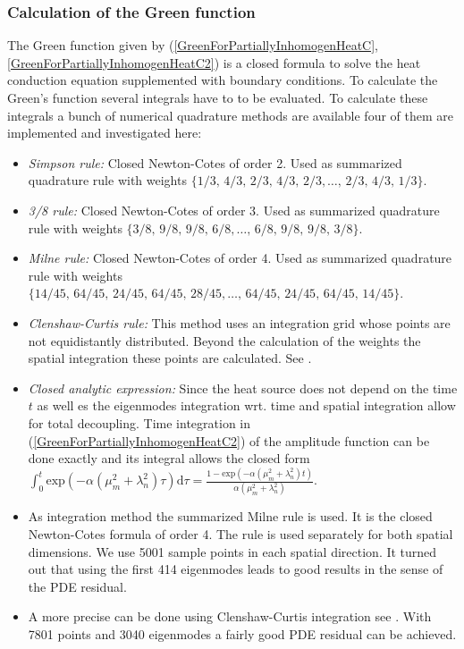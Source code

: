 \documentclass[a4paper,11pt]{article}
\theoremstyle{plain} %
\theoremstyle{definition} %
\theoremstyle{remark} %
\theoremstyle{remark}
\begin{document}
\subsubsection*{Calculation of the Green function}
%
The Green function given by (\ref{GreenForPartiallyInhomogenHeatC},\ref{GreenForPartiallyInhomogenHeatC2}) is a closed formula to solve the heat conduction equation supplemented with boundary conditions. To calculate the Green's function several integrals have to to be evaluated. To calculate these integrals a bunch of numerical quadrature methods are available four of them are implemented and investigated here:
\begin{itemize}
\item \emph{Simpson rule:} Closed Newton-Cotes of order 2. Used as summarized quadrature rule with weights $ \{ 1/3,\, 4/3,\, 2/3,\, 4/3,\, 2/3, \dots ,\, 2/3,\, 4/3,\,  1/3\} $.
\item \emph{3/8 rule:} Closed Newton-Cotes of order 3. Used as summarized quadrature rule with weights $ \{ 3/8,\, 9/8,\,9/8,\,6/8, \dots ,\,6/8,\, 9/8,\,9/8,\, 3/8\} $.
\item \emph{Milne rule:} Closed Newton-Cotes of order 4. Used as summarized quadrature rule with weights $ \{ 14/45,\, 64/45,\,24/45,\, 64/45,\,28/45, \dots ,\, 64/45,\,24/45,\, 64/45,\, 14/45 \} $.
\item \emph{Clenshaw-Curtis rule:} This method uses an integration grid whose points are not equidistantly distributed. Beyond the calculation of the weights the spatial integration these points are calculated. See \cite{waldvogel2006fast}. 
\item \emph{Closed analytic expression:} Since the heat source does not depend on the time $t$ as well es the eigenmodes integration wrt. time and spatial integration allow for total decoupling. Time integration in (\ref{GreenForPartiallyInhomogenHeatC2}) of the amplitude function can be done exactly and its integral allows the closed form $ \int_0^t \mathrm{exp}\left( -\alpha (\mu^2_m + \lambda^2_n ) \tau \right) \mathrm{d}\tau = \frac{1 -\mathrm{exp}\left( -\alpha (\mu^2_m + \lambda^2_n ) t \right)}{\alpha (\mu^2_m + \lambda^2_n )}$.
\end{itemize}
\begin{itemize}
\item As integration method the summarized Milne rule is used. It is the closed Newton-Cotes formula of order 4. The rule is used separately for both spatial dimensions. We use 5001 sample points in each spatial direction. It turned out that using the first 414 eigenmodes leads to good results in the sense of the PDE residual.
\item A more precise can be done using Clenshaw-Curtis integration see \cite{waldvogel2006fast}.  With 7801 points and 3040 eigenmodes a fairly good PDE residual can be achieved.
\end{itemize}
\end{document}
